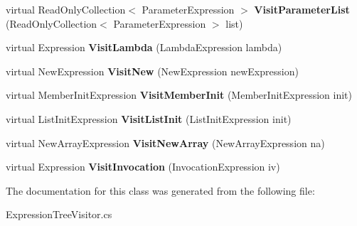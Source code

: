 \begin{DoxyCompactItemize}
\item 
\mbox{\label{class_linq_1_1_expression_tree_visitor_a24e6f94d930b8eee5b80236fd3d91347}} 
virtual Read\+Only\+Collection$<$ Parameter\+Expression $>$ {\bfseries Visit\+Parameter\+List} (Read\+Only\+Collection$<$ Parameter\+Expression $>$ list)
\item 
\mbox{\label{class_linq_1_1_expression_tree_visitor_a4a173a9380f3e635fbbb5e92f71761bf}} 
virtual Expression {\bfseries Visit\+Lambda} (Lambda\+Expression lambda)
\item 
\mbox{\label{class_linq_1_1_expression_tree_visitor_a1e724bcf17d06dcc4f9a6517db5dc8f9}} 
virtual New\+Expression {\bfseries Visit\+New} (New\+Expression new\+Expression)
\item 
\mbox{\label{class_linq_1_1_expression_tree_visitor_a1e976176e2acf4477cb002104e927ecb}} 
virtual Member\+Init\+Expression {\bfseries Visit\+Member\+Init} (Member\+Init\+Expression init)
\item 
\mbox{\label{class_linq_1_1_expression_tree_visitor_a0aaf2842a865eb9aa52014f257a5f062}} 
virtual List\+Init\+Expression {\bfseries Visit\+List\+Init} (List\+Init\+Expression init)
\item 
\mbox{\label{class_linq_1_1_expression_tree_visitor_a50d219d023f1268a3fa16ffab995b361}} 
virtual New\+Array\+Expression {\bfseries Visit\+New\+Array} (New\+Array\+Expression na)
\item 
\mbox{\label{class_linq_1_1_expression_tree_visitor_af65675a92ac29e1f07725385ad4c30cb}} 
virtual Expression {\bfseries Visit\+Invocation} (Invocation\+Expression iv)
\end{DoxyCompactItemize}


The documentation for this class was generated from the following file\+:\begin{DoxyCompactItemize}
\item 
Expression\+Tree\+Visitor.\+cs\end{DoxyCompactItemize}
